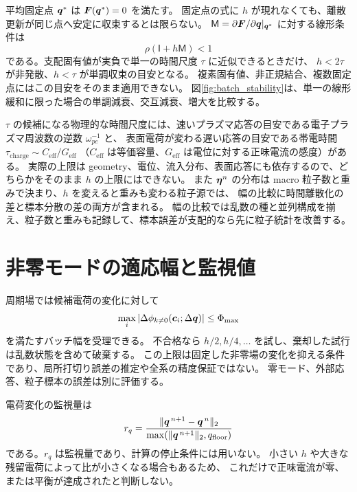 平均固定点 $\bm{q}^*$ は $\bm{F}(\bm{q}^*)=0$ を満たす。
固定点の式に $h$ が現れなくても、離散更新が同じ点へ安定に収束するとは限らない。
$\mathsf M=\partial\bm{F}/\partial\bm{q}|_{\bm{q}^*}$ に対する線形条件は
\begin{equation}
 \rho(\mathsf I+h\mathsf M)<1
\end{equation}
である。支配固有値が実負で単一の時間尺度 $\tau$ に近似できるときだけ、
$h<2\tau$ が非発散、$h<\tau$ が単調収束の目安となる。
複素固有値、非正規結合、複数固定点にはこの目安をそのまま適用できない。
図\ref{fig:batch_stability}は、単一の線形緩和に限った場合の単調減衰、交互減衰、増大を比較する。

$\tau$ の候補になる物理的な時間尺度には、速いプラズマ応答の目安である電子プラズマ周波数の逆数 $\omega_{pe}^{-1}$ と、
表面電荷が変わる遅い応答の目安である帯電時間 $\tau_{\mathrm{charge}}\sim C_{\mathrm{eff}}/G_{\mathrm{eff}}$
（$C_{\mathrm{eff}}$ は等価容量、$G_{\mathrm{eff}}$ は電位に対する正味電流の感度）がある。
実際の上限は geometry、電位、流入分布、表面応答にも依存するので、どちらかをそのまま $h$ の上限にはできない。
また $\bm{\eta}^n$ の分布は macro 粒子数と重みで決まり、$h$ を変えると重みも変わる粒子源では、
幅の比較に時間離散化の差と標本分散の差の両方が含まれる。
幅の比較では乱数の種と並列構成を揃え、粒子数と重みも記録して、標本誤差が支配的なら先に粒子統計を改善する。


\section{非零モードの適応幅と監視値}
周期場では候補電荷の変化に対して
\begin{equation}
 \max_i|\Delta\phi_{k\ne0}(\bm{c}_i;\Delta\bm{q})|\le\Phi_{\max}
\end{equation}
を満たすバッチ幅を受理できる。
不合格なら $h/2,h/4,\ldots$ を試し、棄却した試行は乱数状態を含めて破棄する。
この上限は固定した非零場の変化を抑える条件であり、局所打切り誤差の推定や全系の精度保証ではない。
零モード、外部応答、粒子標本の誤差は別に評価する。

電荷変化の監視量は
\begin{equation}
 r_q=\frac{\lVert\bm{q}^{\,n+1}-\bm{q}^{\,n}\rVert_2}
 {\max(\lVert\bm{q}^{\,n+1}\rVert_2,q_{\mathrm{floor}})}
\end{equation}
である。$r_q$ は監視量であり、計算の停止条件には用いない。
小さい $h$ や大きな残留電荷によって比が小さくなる場合もあるため、
これだけで正味電流が零、または平衡が達成されたと判断しない。
